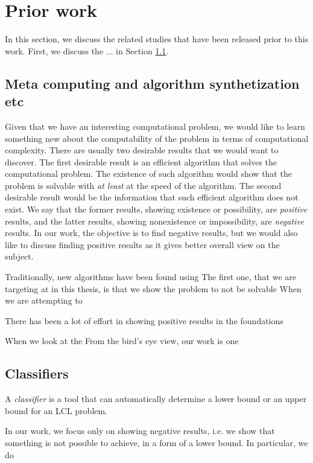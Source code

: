 
\section{Prior work} \label{sec:prior_work}
In this section, we discuss the related studies that have been released prior to this work.
First, we discuss the ... in Section \ref{sec:prior_work:title_a}.

\subsection{Meta computing and algorithm synthetization etc} \label{sec:prior_work:title_a}

Given that we have an interesting computational problem, we would like to learn something new about the computability of the problem in terms of computational complexity.
There are usually two desirable results that we would want to discover.
The first desirable result is an efficient algorithm that solves the computational problem.
The existence of such algorithm would show that the problem is solvable with \emph{at least} at the speed of the algorithm.
The second desirable result would be the information that such efficient algorithm does not exist.
We say that the former results, showing existence or possibility, are \emph{positive} results, and the latter results, showing nonexistence or impossibility, are \emph{negative} results.
In our work, the objective is to find negative results, but we would also like to discuss finding positive results as it gives better overall view on the subject.

Traditionally, new algorithms have been found using
The first one, that we are targeting at in this thesis, is that we show the problem to not be solvable 
When we are attempting to 

There has been a lot of effort in showing positive results in the foundations


When we look at the 
From the bird's eye view, our work is one 

\subsection{Classifiers}

A \emph{classifier} is a tool that can automatically determine a lower bound or an upper bound for an LCL problem.

In our work, we focus only on showing negative results, i.e. we show that something is not possible to achieve, in a form of a lower bound.
In particular, we do


